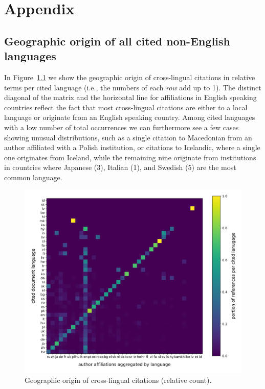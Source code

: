\chapter{Appendix}

\section{Geographic origin of all cited non-English languages}\label{app:geo_origin}

In Figure~\ref{fig:geo_full} we show the geographic origin of cross-lingual citations in relative terms per cited language (i.e., the numbers of each \emph{row} add up to 1). The distinct diagonal of the matrix and the horizontal line for affiliations in English speaking countries reflect the fact that most cross-lingual citations are either to a local language or originate from an English speaking country. Among cited languages with a low number of total occurrences we can furthermore see a few cases showing unusual distributions, such as a single citation to Macedonian from an author affiliated with a Polish institution, or citations to Icelandic, where a single one originates from Iceland, while the remaining nine originate from institutions in countries where Japanese (3), Italian (1), and Swedish (5) are the most common language.

\begin{figure}[tb]
\centering
\includegraphics[width=\textwidth]{figures/ref_xling/citlang_to_author_aff_all_relative_crop.pdf}
\caption{Geographic origin of cross-lingual citations (relative count).} \label{fig:geo_full}
\end{figure}

